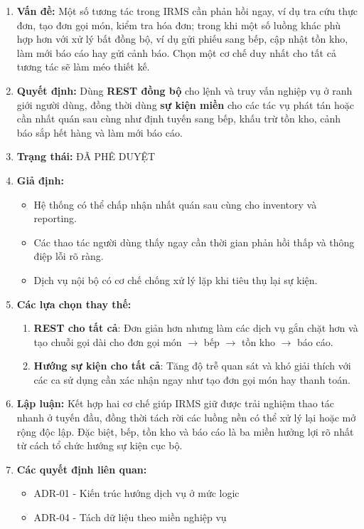 \documentclass[11pt,a4paper]{article}
\begin{document}
\begin{adrbox}[title={ADR-03: Kết Hợp REST Đồng Bộ Với Domain Events Bất Đồng Bộ}]
\begin{enumerate}[leftmargin=1.9em,label=\arabic*.]
  \item \textbf{Vấn đề:} Một số tương tác trong IRMS cần phản hồi ngay, ví dụ tra cứu thực đơn, tạo đơn gọi món, kiểm tra hóa đơn; trong khi một số luồng khác phù hợp hơn với xử lý bất đồng bộ, ví dụ gửi phiếu sang bếp, cập nhật tồn kho, làm mới báo cáo hay gửi cảnh báo. Chọn một cơ chế duy nhất cho tất cả tương tác sẽ làm méo thiết kế.
  \item \textbf{Quyết định:} Dùng \textbf{REST đồng bộ} cho lệnh và truy vấn nghiệp vụ ở ranh giới người dùng, đồng thời dùng \textbf{sự kiện miền} cho các tác vụ phát tán hoặc cần nhất quán sau cùng như định tuyến sang bếp, khấu trừ tồn kho, cảnh báo sắp hết hàng và làm mới báo cáo.
  \item \textbf{Trạng thái:} ĐÃ PHÊ DUYỆT
  \item \textbf{Giả định:}
  \begin{itemize}[leftmargin=1.8em]
    \item Hệ thống có thể chấp nhận nhất quán sau cùng cho inventory và reporting.
    \item Các thao tác người dùng thấy ngay cần thời gian phản hồi thấp và thông điệp lỗi rõ ràng.
    \item Dịch vụ nội bộ có cơ chế chống xử lý lặp khi tiêu thụ lại sự kiện.
  \end{itemize}
  \item \textbf{Các lựa chọn thay thế:}
  \begin{enumerate}[label=(\alph*),leftmargin=2.1em]
    \item \textbf{REST cho tất cả}: Đơn giản hơn nhưng làm các dịch vụ gắn chặt hơn và tạo chuỗi gọi dài cho đơn gọi món $\rightarrow$ bếp $\rightarrow$ tồn kho $\rightarrow$ báo cáo.
    \item \textbf{Hướng sự kiện cho tất cả}: Tăng độ trễ quan sát và khó giải thích với các ca sử dụng cần xác nhận ngay như tạo đơn gọi món hay thanh toán.
  \end{enumerate}
  \item \textbf{Lập luận:} Kết hợp hai cơ chế giúp IRMS giữ được trải nghiệm thao tác nhanh ở tuyến đầu, đồng thời tách rời các luồng nền có thể xử lý lại hoặc mở rộng độc lập. Đặc biệt, bếp, tồn kho và báo cáo là ba miền hưởng lợi rõ nhất từ cách tổ chức hướng sự kiện cục bộ.
  \item \textbf{Các quyết định liên quan:}
  \begin{itemize}[leftmargin=1.8em]
    \item ADR-01 - Kiến trúc hướng dịch vụ ở mức logic
    \item ADR-04 - Tách dữ liệu theo miền nghiệp vụ
  \end{itemize}
\end{enumerate}
\end{adrbox}
\end{document}
